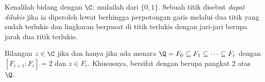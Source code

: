 \begin{definition}\label{def:b3:galois:constructible}
Kenalilah bidang dengan $\C$; mulailah dari $\{0, 1\}$. Sebuah titik disebut
\emph{dapat dilukis} jika ia
diperoleh lewat berhingga perpotongan garis melalui dua
titik yang sudah terlukis dan lingkaran berpusat di titik terlukis
dengan jari-jari berupa jarak dua titik terlukis.
\end{definition}

\begin{theorem}[Wantzel]\label{thm:b3:galois:wantzel}
Bilangan $z \in \C$  jika dan hanya jika ada menara $\Q = F_0
\subseteq F_1 \subseteq \dots \subseteq F_r$ dengan $[F_{i+1} :
F_i] = 2$ dan $z \in F_r$. Khususnya, 
bersifat  dengan  berupa pangkat $2$ atas
$\Q$.
\end{theorem}

